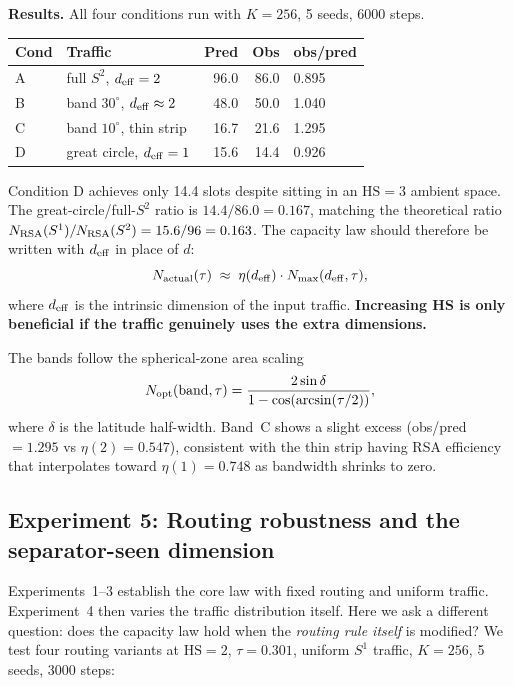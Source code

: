 \documentclass[11pt]{article}
\begin{document}
\textbf{Results.}
All four conditions run with $K=256$, 5 seeds, 6000 steps.
\begin{center}
\begin{tabular}{llrrl}
\toprule
Cond & Traffic & Pred & Obs & obs/pred \\
\midrule
A & full $S^2$, $d_{\rm eff}=2$ & 96.0 & 86.0 & 0.895 \\
B & band $30^\circ$, $d_{\rm eff}\approx 2$ & 48.0 & 50.0 & 1.040 \\
C & band $10^\circ$, thin strip & 16.7 & 21.6 & 1.295 \\
D & great circle, $d_{\rm eff}=1$ & 15.6 & 14.4 & 0.926 \\
\bottomrule
\end{tabular}
\end{center}

Condition D achieves only 14.4 slots despite sitting in an $\mathrm{HS}=3$ ambient
space.
The great-circle/full-$S^2$ ratio is $14.4/86.0 = 0.167$, matching the
theoretical ratio $N_{\rm RSA}(S^1)/N_{\rm RSA}(S^2) = 15.6/96 = 0.163$.
The capacity law should therefore be written with $d_{\rm eff}$ in place of $d$:
\begin{equation}
  N_{\rm actual}(\tau) \;\approx\; \eta(d_{\rm eff})\cdot N_{\max}(d_{\rm eff}, \tau),
  \label{eq:deff_law}
\end{equation}
where $d_{\rm eff}$ is the intrinsic dimension of the input traffic.
\textbf{Increasing HS is only beneficial if the traffic genuinely uses the extra
dimensions.}

The bands follow the spherical-zone area scaling
\[
  N_{\rm opt}(\text{band},\tau) = \frac{2\sin\delta}{1-\cos(\arcsin(\tau/2))},
\]
where $\delta$ is the latitude half-width.
Band~C shows a slight excess (obs/pred $=1.295$ vs $\eta(2)=0.547$),
consistent with the thin strip having RSA efficiency that interpolates
toward $\eta(1)=0.748$ as bandwidth shrinks to zero.

\subsection{Experiment 5: Routing robustness and the separator-seen dimension}
\label{sec:routing}

Experiments~1--3 establish the core law with fixed routing and uniform traffic.
Experiment~4 then varies the traffic distribution itself.
Here we ask a different question: does the capacity law hold when the
\emph{routing rule itself} is modified?
We test four routing variants at $\mathrm{HS}=2$, $\tau=0.301$, uniform
$S^1$ traffic, $K=256$, 5 seeds, 3000 steps:
\end{document}
